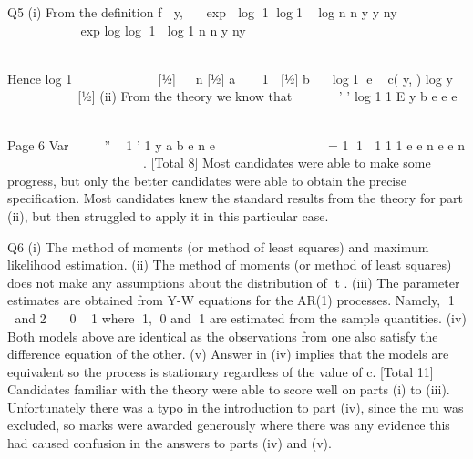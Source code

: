 \documentclass[a4paper,12pt]{article}
\begin{document}

Q5 (i) From the definition
f  y,   exp  log 1 log1  log
n
n y y
ny
  
        
  
exp log log 1  log
1
n
n y
ny
       
                 

Hence
log
1
  
      
[½]
  n [½]
a   1

[½]
b  log1 e  
c( y, ) log
y



 
  
 
[½]
(ii) From the theory we know that
     '
' log 1
1
E y b e e
e


       


Page 6
Var     ''  1 '
1
y a b e
n e


 
        
=
1 1  1
1 1
e e
n e e n
 
 
   
       
. 
[Total 8]
Most candidates were able to make some progress, but only the better
candidates were able to obtain the precise specification. Most candidates
knew the standard results from the theory for part (ii), but then struggled to
apply it in this particular case.

Q6 (i) The method of moments (or method of least squares) and maximum likelihood
estimation. 
(ii) The method of moments (or method of least squares) does not make any
assumptions about the distribution of t . 
(iii) The parameter estimates are obtained from Y-W equations for the AR(1)
processes. 
Namely, 1   and 2
  0 1 where 1, 0 and 1 are estimated from
the sample quantities. 
(iv) Both models above are identical as the observations from one also satisfy the
difference equation of the other. 
(v) Answer in (iv) implies that the models are equivalent so the process is
stationary regardless of the value of c. 
[Total 11]
Candidates familiar with the theory were able to score well on parts (i) to (iii).
Unfortunately there was a typo in the introduction to part (iv), since the mu was excluded, so marks were awarded generously where there was any evidence this had caused confusion in the answers to parts (iv) and (v).
\end{document}
